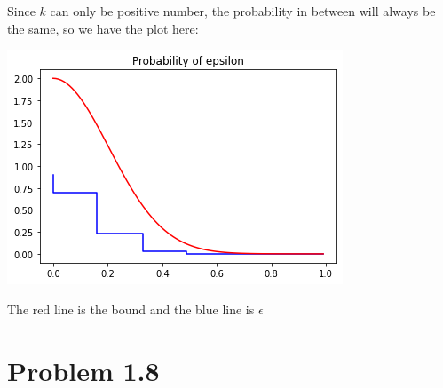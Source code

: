 \documentclass{article}
\def\math#1{$#1$}
\begin{document}
\begin{enumerate}[a)]
        Since \math{k} can only be positive number, the probability in between will always be the same, so we have the plot here:
        
        \includegraphics{1.7/1}
        
        The red line is the bound and the blue line is \math{\epsilon}
\end{enumerate}

\section{Problem 1.8}
\end{document}
